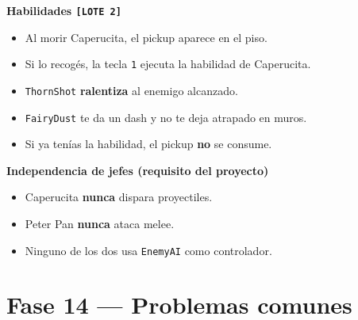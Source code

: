 \documentclass[a4paper,12pt]{article}
\newcommand{\code}[1]{\texttt{#1}}
\begin{document}
\textbf{Habilidades \code{[LOTE 2]}}

\begin{itemize}[label=$\square$]
    \item Al morir Caperucita, el pickup aparece en el piso.
    \item Si lo recogés, la tecla \code{1} ejecuta la habilidad de Caperucita.
    \item \code{ThornShot} \textbf{ralentiza} al enemigo alcanzado.
    \item \code{FairyDust} te da un dash y no te deja atrapado en muros.
    \item Si ya tenías la habilidad, el pickup \textbf{no} se consume.
\end{itemize}

\textbf{Independencia de jefes (requisito del proyecto)}

\begin{itemize}[label=$\square$]
    \item Caperucita \textbf{nunca} dispara proyectiles.
    \item Peter Pan \textbf{nunca} ataca melee.
    \item Ninguno de los dos usa \code{EnemyAI} como controlador.
\end{itemize}

\section{Fase 14 --- Problemas comunes}
\end{document}

